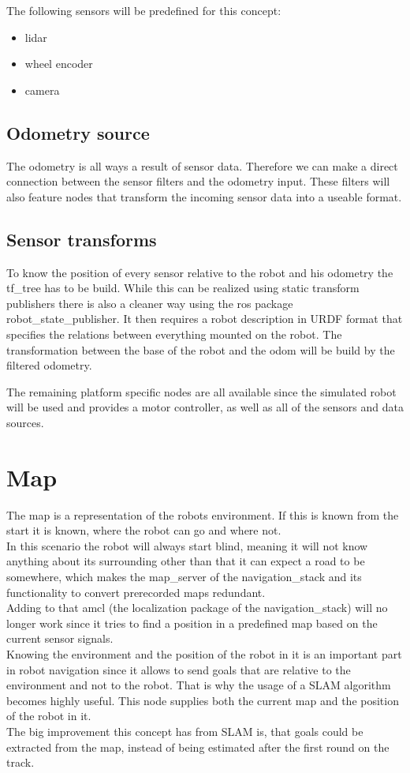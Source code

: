 The following sensors will be predefined for this concept:

\begin{itemize}
	\item lidar
	\item wheel encoder
	\item camera
\end{itemize}


\subsection{Odometry source}
The odometry is all ways a result of sensor data. Therefore we can make a direct connection between the sensor filters and the odometry input. These filters will also feature nodes that transform the incoming sensor data into a useable format.

\subsection{Sensor transforms}
To know the position of every sensor relative to the robot and his odometry the tf\_tree has to be build. While this can be realized using static transform publishers there is also a cleaner way using the ros package robot\_state\_publisher. It then requires a robot description in URDF format that specifies the relations between everything mounted on the robot.
The transformation between the base of the robot and the odom will be build by the filtered odometry.

The remaining platform specific nodes are all available since the simulated robot will be used and provides a motor controller, as well as all of the sensors and data sources.

\section{Map}

The map is a representation of the robots environment. If this is known from the start it is known, where the robot can go and where not.\\
 In this scenario the robot will always start blind, meaning it will not know anything about its surrounding other than that it can expect a road to be somewhere, which makes the map\_server of the navigation\_stack and its functionality to convert prerecorded maps redundant.\\
Adding to that amcl (the localization package of the navigation\_stack) will no longer work since it tries to find a position in a predefined map based on the current sensor signals.\\
Knowing the environment and the position of the robot in it is an important part in robot navigation since it allows to send goals that are relative to the environment and not to the robot. That is why the usage of a SLAM algorithm becomes highly useful. This node supplies both the current map and the position of the robot in it.\\
The big improvement this concept has from SLAM is, that goals could be extracted from the map, instead of being estimated after the first round on the track.

